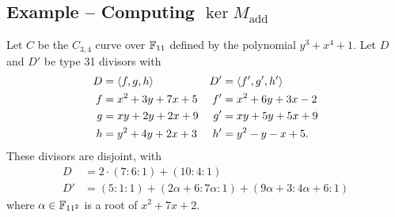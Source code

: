 \begin{comment}
This algorithm requires that we be able to reduce divisors
in lines \ref{alg_addition:return_2}, \ref{alg_addition:return_3}, and \ref{alg_addition:return_4},
to double divisors in lines \ref{alg_addition:return_3} and \ref{alg_addition:return_4},
or possibly to triple degree 1 divisors in line \ref{alg_addition:return_4}.
Assume for now that we have terminating algorithms for these operations.
We wish to show that the addition Algorithm \ref{alg_addition}.

This algorithm has five return statements.
If the algorithm reaches \ref{alg_addition:return_0} or \ref{alg_addition:return_1},
then the algorithm terminates.
If the algorithm returns at line \ref{alg_addition:return_4},
then $(n + 1)D'$ and $A$ will be disjoint,
and the algorithm will reach at line \ref{alg_addition:return_1} in its next iteration
(or line \ref{alg_addition:return_0} if $A = 0$).
At lines \ref{alg_addition:return_2} and \ref{alg_addition:return_3},
$G$ and $A$ are of lesser degree than $D'$.
Eventually, a recursive call will involve $D'$ of degree 0 --
in which case the next interation reaches line \ref{alg_addition:return_0} --
or 1 --
in which case $\rank M$ is either 1 or 0
and the next iteration reaches line \ref{alg_addition:return_1} or \ref{alg_addition:return_4} and terminates.

Whether or not this algorithm terminates therefore depends on whether we have terminating algorithms
for reducing divisors, doubling divisors, and tripling points.
These are the topics of the next two chapters.
\end{comment}



\subsection{Example -- Computing $\ker M_{\text{add}}$}

Let $C$ be the $C_{3,4}$ curve over $\mathbb{F}_{11}$ defined by the polynomial $y^3 + x^4 + 1$.
Let $D$ and $D'$ be type 31 divisors with
\begin{align*}
  D  &= \left\langle f, g, h \right\rangle     & D' &= \left\langle f', g', h' \right\rangle \\
  f  &= x^2 + 3y + 7x + 5 & f' &= x^2 + 6y + 3x - 2 \\
  g  &= xy + 2y + 2x + 9  & g' &= xy + 5y + 5x + 9 \\
  h  &= y^2 + 4y + 2x + 3 & h' &= y^2 - y - x + 5.
\end{align*}
These divisors are disjoint, with
\begin{align*}
  D &= 2 \cdot (7 : 6 : 1) + (10 : 4 : 1) \\
  D' &= (5 : 1 : 1) + (2\alpha + 6 : 7\alpha : 1) + (9\alpha + 3 : 4\alpha + 6 : 1)
\end{align*}
where $\alpha \in \mathbb{F}_{11^2}$ is a root of $x^2 + 7x + 2$.

